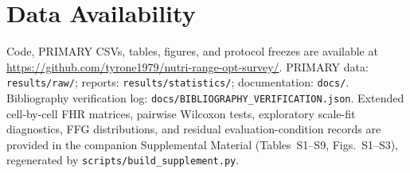 \documentclass[lettersize,journal]{IEEEtran}
\begin{document}
\section*{Data Availability}
Code, PRIMARY CSVs, tables, figures, and protocol freezes are available at \url{https://github.com/tyrone1979/nutri-range-opt-survey/}.
PRIMARY data: \texttt{results/raw/}; reports: \texttt{results/statistics/}; documentation: \texttt{docs/}.
Bibliography verification log: \texttt{docs/BIBLIOGRAPHY\_VERIFICATION.json}.
Extended cell-by-cell FHR matrices, pairwise Wilcoxon tests, exploratory scale-fit diagnostics, FFG distributions, and residual evaluation-condition records are provided in the companion Supplemental Material (Tables~S1--S9, Figs.~S1--S3), regenerated by \texttt{scripts/build\_supplement.py}.

\balance


\end{document}
